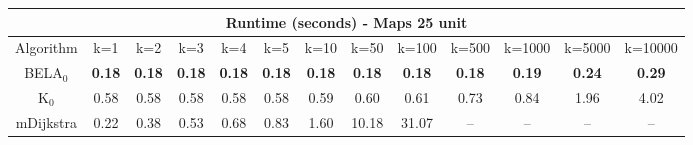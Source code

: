 \begin{tabular}{c|cccccccccccc}\toprule
\multicolumn{13}{c}{Runtime (seconds) - Maps 25 unit}\\ \midrule
Algorithm & k=1 & k=2 & k=3 & k=4 & k=5 & k=10 & k=50 & k=100 & k=500 & k=1000 & k=5000 & k=10000 \\ \midrule
BELA$_0$ & \textbf{0.18} & \textbf{0.18} & \textbf{0.18} & \textbf{0.18} & \textbf{0.18} & \textbf{0.18} & \textbf{0.18} & \textbf{0.18} & \textbf{0.18} & \textbf{0.19} & \textbf{0.24} & \textbf{0.29} \\
K$_0$ & 0.58 & 0.58 & 0.58 & 0.58 & 0.58 & 0.59 & 0.60 & 0.61 & 0.73 & 0.84 & 1.96 & 4.02 \\
mDijkstra & 0.22 & 0.38 & 0.53 & 0.68 & 0.83 & 1.60 & 10.18 & 31.07 & -- & -- & -- & -- \\ \bottomrule 
\end{tabular}
